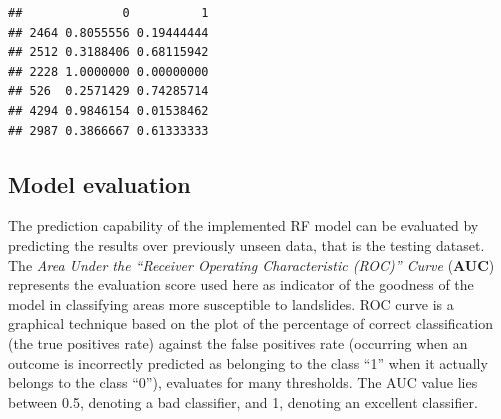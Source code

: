 \documentclass[
]{book}
\newenvironment{Shaded}{\begin{snugshade}}{\end{snugshade}}
\newcommand{\AttributeTok}[1]{\textcolor[rgb]{0.13,0.29,0.53}{#1}}
\newcommand{\CommentTok}[1]{\textcolor[rgb]{0.56,0.35,0.01}{\textit{#1}}}
\newcommand{\DecValTok}[1]{\textcolor[rgb]{0.00,0.00,0.81}{#1}}
\newcommand{\FunctionTok}[1]{\textcolor[rgb]{0.13,0.29,0.53}{\textbf{#1}}}
\newcommand{\NormalTok}[1]{#1}
\newcommand{\OtherTok}[1]{\textcolor[rgb]{0.56,0.35,0.01}{#1}}
\newcommand{\SpecialCharTok}[1]{\textcolor[rgb]{0.81,0.36,0.00}{\textbf{#1}}}
\newcommand{\StringTok}[1]{\textcolor[rgb]{0.31,0.60,0.02}{#1}}
\begin{document}
\begin{verbatim}
##              0          1
## 2464 0.8055556 0.19444444
## 2512 0.3188406 0.68115942
## 2228 1.0000000 0.00000000
## 526  0.2571429 0.74285714
## 4294 0.9846154 0.01538462
## 2987 0.3866667 0.61333333
\end{verbatim}

\hypertarget{model-evaluation}{%
\subsection{Model evaluation}\label{model-evaluation}}

The prediction capability of the implemented RF model can be evaluated by predicting the results over previously unseen data, that is the testing dataset.
The \emph{Area Under the ``Receiver Operating Characteristic (ROC)'' Curve} (\textbf{AUC}) represents the evaluation score used here as indicator of the goodness of the model in classifying areas more susceptible to landslides.
ROC curve is a graphical technique based on the plot of the percentage of correct classification (the true positives rate) against the false positives rate (occurring when an outcome is incorrectly predicted as belonging to the class ``1'' when it actually belongs to the class ``0''), evaluates for many thresholds.
The AUC value lies between 0.5, denoting a bad classifier, and 1, denoting an excellent classifier.

\begin{Shaded}
\end{Shaded}
\end{document}
